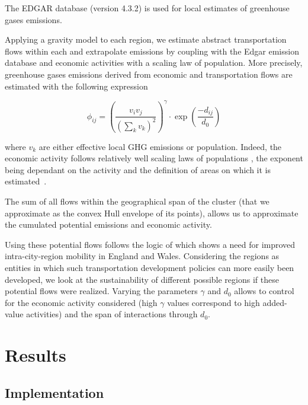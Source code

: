 \documentclass{jimis-en}
\begin{document}
The EDGAR database \citep{janssens2017edgar} (version 4.3.2) is used for local estimates of greenhouse gases emissions.



Applying a gravity model to each region, we estimate abstract transportation flows within each and extrapolate emissions by coupling with the Edgar emission database \citep{janssens2017edgar} and economic activities with a scaling law of population.  More precisely, greenhouse gases emissions derived from economic and transportation flows are estimated with the following expression 

\begin{equation}
\phi_{ij} = \left(\frac{v_i v_j}{(\sum_k v_k)^2}\right)^\gamma \cdot \exp\left(\frac{-d_{ij}}{d_0}\right)
\end{equation}

where $v_k$ are either effective local GHG emissions or population. Indeed, the economic activity follows relatively well scaling laws of populations \cite{bettencourt2007growth}, the exponent being dependant on the activity and the definition of areas on which it is estimated~\citep{cottineau2017diverse}.


The sum of all flows within the geographical span of the cluster (that we approximate as the convex Hull envelope of its points), allows us to approximate the cumulated potential emissions and economic activity.

Using these potential flows follows the logic of \cite{arbabi2019development} which shows a need for improved intra-city-region mobility in England and Wales. Considering the regions as entities in which such transportation development policies can more easily been developed, we look at the sustainability of different possible regions if these potential flows were realized. Varying the parameters $\gamma$ and $d_0$ allows to control for the economic activity considered (high $\gamma$ values correspond to high added-value activities) and the span of interactions through $d_0$.



\section{Results}

\subsection{Implementation}
\end{document}
